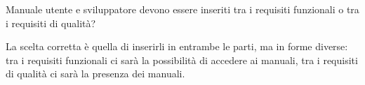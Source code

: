 \begin{itemize}
  \begin{minipage}[c]{0.47\textwidth}
    \centering
    Manuale utente e sviluppatore devono essere inseriti tra i requisiti funzionali o tra i requisiti di qualità?
  \end{minipage}
  \hfill
  \begin{minipage}[c]{0.47\textwidth}
    \centering
    La scelta corretta è quella di inserirli in entrambe le parti, ma in forme diverse: tra i requisiti funzionali ci sarà la possibilità di accedere ai manuali, tra i requisiti di qualità ci sarà la presenza dei manuali.
  \end{minipage}
\end{itemize}
